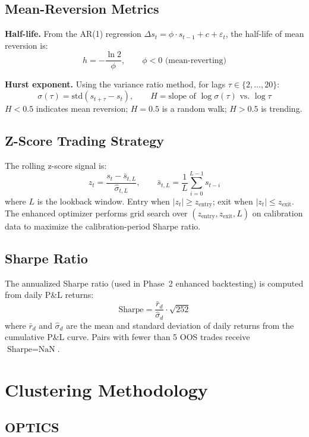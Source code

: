 \documentclass[11pt, a4paper]{article}
\begin{document}
\subsection{Mean-Reversion Metrics}

\textbf{Half-life.} From the AR(1) regression $\Delta s_t = \phi \cdot s_{t-1} + c + \varepsilon_t$, the half-life of mean reversion is:
\[
h = -\frac{\ln 2}{\phi}, \qquad \phi < 0 \text{ (mean-reverting)}
\]

\textbf{Hurst exponent.} Using the variance ratio method, for lags $\tau \in \{2, \ldots, 20\}$:
\[
\sigma(\tau) = \text{std}(s_{t+\tau} - s_t), \qquad H = \text{slope of } \log \sigma(\tau) \text{ vs.\ } \log \tau
\]
$H < 0.5$ indicates mean reversion; $H = 0.5$ is a random walk; $H > 0.5$ is trending.

\subsection{Z-Score Trading Strategy}

The rolling z-score signal is:
\[
z_t = \frac{s_t - \bar{s}_{t,L}}{\hat{\sigma}_{t,L}}, \qquad \bar{s}_{t,L} = \frac{1}{L}\sum_{i=0}^{L-1} s_{t-i}
\]
where $L$ is the lookback window. Entry when $|z_t| \geq z_{\text{entry}}$; exit when $|z_t| \leq z_{\text{exit}}$. The enhanced optimizer performs grid search over $(z_{\text{entry}}, z_{\text{exit}}, L)$ on calibration data to maximize the calibration-period Sharpe ratio.

\subsection{Sharpe Ratio}

The annualized Sharpe ratio (used in Phase~2 enhanced backtesting) is computed from daily P\&L returns:
\[
\text{Sharpe} = \frac{\bar{r}_d}{\hat{\sigma}_d} \cdot \sqrt{252}
\]
where $\bar{r}_d$ and $\hat{\sigma}_d$ are the mean and standard deviation of daily returns from the cumulative P\&L curve. Pairs with fewer than 5 OOS trades receive $\text{Sharpe} = \text{NaN}$.

\section{Clustering Methodology}

\subsection{OPTICS}
\end{document}
